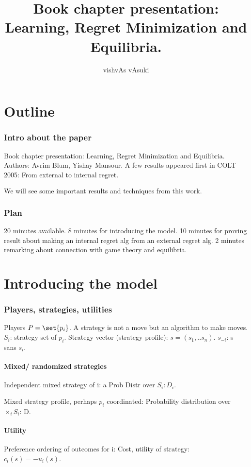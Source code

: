 \documentclass[10pt]{amsart}
\title{Book chapter presentation: Learning, Regret Minimization and Equilibria.}
\author{vishvAs vAsuki}
\begin{document}
\maketitle

\part{Outline}

\section{Intro about the paper}
Book chapter presentation: Learning, Regret Minimization and Equilibria. \cite{algGameTheory} Authors: Avrim Blum, Yishay Mansour. A few results appeared first in COLT 2005: From external to internal regret.

We will see some important results and techniques from this work.

\section{Plan}
20 minutes available. 8 minutes for introducing the model. 10 minutes for proving result about making an internal regret alg from an external regret alg. 2 minutes remarking about connection with game theory and equilibria.

\part{Introducing the model}

\section{Players, strategies, utilities}
Players $P = \set{p_{i}}$. A strategy is not a move but an algorithm to make moves. $S_{i}$: strategy set of $p_{i}$. Strategy vector (strategy profile): $s = (s_{1}, .. s_{n})$. $s_{-i}$: s sans $s_{i}$.

\subsection{Mixed/ randomized strategies}
Independent mixed strategy of i: a Prob Distr over $S_{i}: D_{i}$.

Mixed strategy profile, perhaps $p_{i}$ coordinated: Probability distribution over $\times_{i}S_{i}$: D.

\subsection{Utility}
Preference ordering of outcomes for i: Cost, utility of strategy:\\
 $c_{i}(s) = -u_{i}(s)$.
\end{document}
